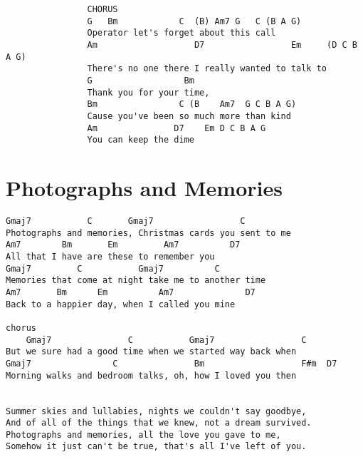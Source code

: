 \documentclass[leqno]{memoir}
\begin{document}
\begin{verbatim}
                CHORUS
                G   Bm            C  (B) Am7 G   C (B A G)
                Operator let's forget about this call
                Am                   D7                 Em     (D C B A G)
                There's no one there I really wanted to talk to
                G                  Bm
                Thank you for your time,
                Bm                C (B    Am7  G C B A G)
                Cause you've been so much more than kind
                Am               D7    Em D C B A G
                You can keep the dime

\end{verbatim}
\newpage



\chapter{Photographs and Memories}
\begin{verbatim}
Gmaj7           C       Gmaj7                 C
Photographs and memories, Christmas cards you sent to me
Am7        Bm       Em         Am7          D7
All that I have are these to remember you
Gmaj7         C           Gmaj7          C
Memories that come at night take me to another time
Am7       Bm      Em          Am7              D7
Back to a happier day, when I called you mine

chorus
    Gmaj7               C           Gmaj7                 C
But we sure had a good time when we started way back when
Gmaj7                C               Bm                   F#m  D7
Morning walks and bedroom talks, oh, how I loved you then


Summer skies and lullabies, nights we couldn't say goodbye,
And of all of the things that we knew, not a dream survived.
Photographs and memories, all the love you gave to me,
Somehow it just can't be true, that's all I've left of you.
\end{verbatim}
\newpage
\end{document}
